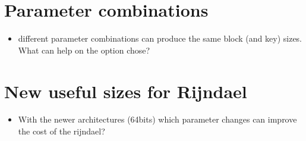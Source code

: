 \documentclass[10pt,a4paper,twoside]{llncs}
\begin{document}
\section{Parameter combinations}
\begin{itemize}
 \item different parameter combinations can produce the same block (and key) sizes. What can help on the option chose?
\end{itemize}


\section{New useful sizes for Rijndael}
\begin{itemize}
 \item With the newer architectures (64bits) which parameter changes can improve the cost of the rijndael? \cite{Daemen:1999:EBC:1267115.1267119}
\end{itemize}

% 



\end{document}
